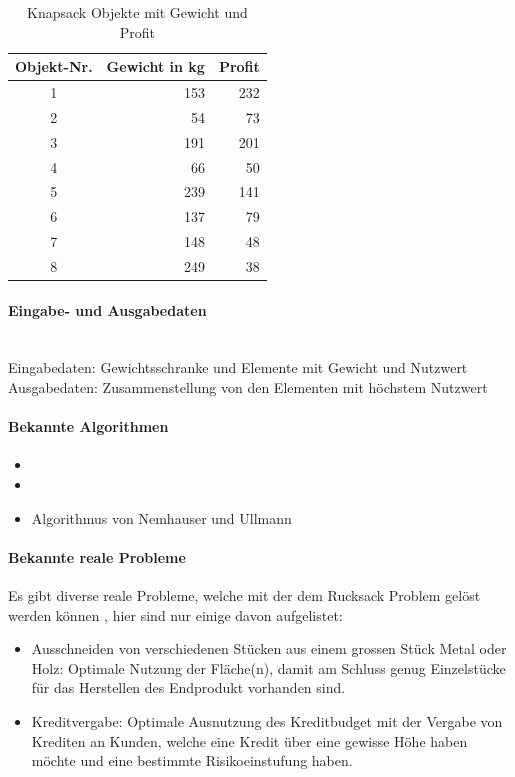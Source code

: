 \begin{table}[ht]
\centering
  \begin{tabular}{ c | r | r }
	\hline
	\rowcolor{gray}
	\textbf{Objekt-Nr.}	&	\textbf{Gewicht in kg}	&	\textbf{Profit}\\ \hline
	1			&	153			&	232\\ \hline
	2			&	54			&	73\\ \hline
	3			&	191			&	201\\ \hline
	4			&	66			&	50\\ \hline
	5			&	239			&	141\\ \hline
	6			&	137			&	79\\ \hline
	7			&	148			&	48\\ \hline
	8			&	249			&	38
  \end{tabular}
   \caption{Knapsack Objekte mit Gewicht und Profit}\label{table:knapsack_objects}
\end{table}

	\paragraph{Eingabe- und Ausgabedaten}\mbox{}\\
	Eingabedaten: Gewichtsschranke und Elemente mit Gewicht und Nutzwert\\
	Ausgabedaten: Zusammenstellung von den Elementen mit höchstem Nutzwert

	\paragraph{Bekannte Algorithmen}
	\begin{itemize}
		\item {}
		\item {}
		\item Algorithmus von Nemhauser und Ullmann \cite{knapsack_desc_web}
	\end{itemize}	

	\paragraph{Bekannte reale Probleme}	
	Es gibt diverse reale Probleme, welche mit der dem Rucksack Problem gelöst werden können \cite{kellerer2004knapsack}, hier sind nur einige davon aufgelistet:
	\begin{itemize}
		\item Ausschneiden von verschiedenen Stücken aus einem grossen Stück Metal oder Holz: Optimale Nutzung der Fläche(n), damit am Schluss genug Einzelstücke für das Herstellen des Endprodukt vorhanden sind.
		\item Kreditvergabe: Optimale Ausnutzung des Kreditbudget mit der Vergabe von Krediten an Kunden, welche eine Kredit über eine gewisse Höhe haben möchte und eine bestimmte Risikoeinstufung haben.
	\end{itemize}


